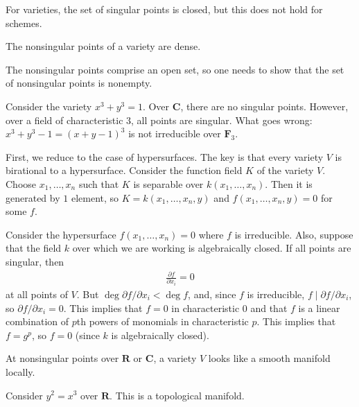 \documentclass[11pt, oneside,margin=1in]{article}
\begin{document}
\begin{warn}
	For varieties, the set of singular points is closed, but this does not hold for schemes.
\end{warn}

\begin{proposition}[ ]\label{}\text{}
The nonsingular points of a variety are dense.
\end{proposition}

The nonsingular points comprise an open set, so one needs to show that the set of nonsingular points is nonempty. 

\begin{example}[ ]\label{}\text{}
Consider the variety $x^3+y^3=1$. Over $\mathbf{C}$, there are no singular points. However, over a field of characteristic $3$, all points are singular. What goes wrong: $x^3+y^3-1=(x+y-1)^3$ is not irreducible over $\mathbf{F}_{3}$.
\end{example}


First, we reduce to the case of hypersurfaces. The key is that every variety $V$ is birational to a hypersurface. Consider the function field $K$ of the variety $V$. Choose $x_1,\hdots, x_n$ such that $K$ is separable over $k(x_1,\hdots, x_n)$. Then it is generated by $1$ element, so $K=k(x_1,\hdots, x_n,y)$ and $f(x_1,\hdots, x_n,y)=0$ for some $f$.

Consider the hypersurface $f(x_1,\hdots, x_n)=0$ where $f$ is irreducible. Also, suppose that the field $k$ over which we are working is algebraically closed. If all points are singular, then 
\begin{align*}
	\frac{\partial f}{\partial x_i} =0
\end{align*}
at all points of $V$. But $\deg \partial f/\partial x_i< \deg f$, and, since $f$ is irreducible, $f\mid \partial f/\partial x_i$, so $\partial f/\partial x_i =0$. This implies that $f=0$ in characteristic $0$ and that $f$ is a linear combination of $p$th powers of monomials in characteristic $p$. This implies that $f=g^p$, so $f=0$  (since $k$ is algebraically closed).

 \begin{remark}\label{convvv}
	At nonsingular points over $\mathbf{R}$ or $\mathbf{C}$, a variety $V$ looks like a smooth manifold locally.
\end{remark}

\begin{example}\label{}\text{}
Consider $y^2=x^3$ over $\mathbf{R}$. This is a topological manifold.
\end{example}
\end{document}
